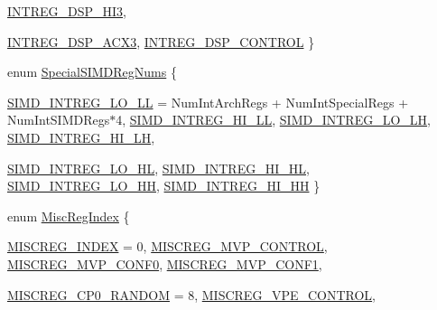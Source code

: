 \begin{DoxyCompactItemize}
\hyperlink{namespaceMipsISA_a9969c99e14b7b491ae9e3751404cc6a1a985097d69553dc760c911447989f8e60}{INTREG\_\-DSP\_\-HI3}, 
\par
\hyperlink{namespaceMipsISA_a9969c99e14b7b491ae9e3751404cc6a1a7b37f81d5304a3d791c17361d9f3a454}{INTREG\_\-DSP\_\-ACX3}, 
\hyperlink{namespaceMipsISA_a9969c99e14b7b491ae9e3751404cc6a1a6e80b2e1811d722f397003fc3aa77298}{INTREG\_\-DSP\_\-CONTROL}
 \}
\item 
enum \hyperlink{namespaceMipsISA_a05e4fcfbdafc2aca59e48af73c7f12ec}{SpecialSIMDRegNums} \{ \par
\hyperlink{namespaceMipsISA_a05e4fcfbdafc2aca59e48af73c7f12ecaf0bcaabf7ff02dc3aaecd4bbf5462813}{SIMD\_\-INTREG\_\-LO\_\-LL} =  NumIntArchRegs + NumIntSpecialRegs + NumIntSIMDRegs$\ast$4, 
\hyperlink{namespaceMipsISA_a05e4fcfbdafc2aca59e48af73c7f12ecac23523b35484e7acda24945e39321a9d}{SIMD\_\-INTREG\_\-HI\_\-LL}, 
\hyperlink{namespaceMipsISA_a05e4fcfbdafc2aca59e48af73c7f12eca23f8f913021c11fa71ba055577cf9a6f}{SIMD\_\-INTREG\_\-LO\_\-LH}, 
\hyperlink{namespaceMipsISA_a05e4fcfbdafc2aca59e48af73c7f12ecaa4f542f3a336be0189b3c160a64422ca}{SIMD\_\-INTREG\_\-HI\_\-LH}, 
\par
\hyperlink{namespaceMipsISA_a05e4fcfbdafc2aca59e48af73c7f12eca646de05bcf6a124da8ef80cf70e19176}{SIMD\_\-INTREG\_\-LO\_\-HL}, 
\hyperlink{namespaceMipsISA_a05e4fcfbdafc2aca59e48af73c7f12eca0b06ae619c82ecbcdd19075de12a5a5d}{SIMD\_\-INTREG\_\-HI\_\-HL}, 
\hyperlink{namespaceMipsISA_a05e4fcfbdafc2aca59e48af73c7f12eca9536486f8f579789069507950c88b7c3}{SIMD\_\-INTREG\_\-LO\_\-HH}, 
\hyperlink{namespaceMipsISA_a05e4fcfbdafc2aca59e48af73c7f12eca9cb0f33583f9adc323b378926c06e2de}{SIMD\_\-INTREG\_\-HI\_\-HH}
 \}
\item 
enum \hyperlink{namespaceMipsISA_a1e522017e015d4c7efd6b2360143aa67}{MiscRegIndex} \{ \par
\hyperlink{namespaceMipsISA_a1e522017e015d4c7efd6b2360143aa67a8362d5a2c785b2b0d1c4e7d8c92689dd}{MISCREG\_\-INDEX} =  0, 
\hyperlink{namespaceMipsISA_a1e522017e015d4c7efd6b2360143aa67a9f330518fd117878b5bee376da98c30b}{MISCREG\_\-MVP\_\-CONTROL}, 
\hyperlink{namespaceMipsISA_a1e522017e015d4c7efd6b2360143aa67a75bfc4f27d49814617ea01dbcb4058d8}{MISCREG\_\-MVP\_\-CONF0}, 
\hyperlink{namespaceMipsISA_a1e522017e015d4c7efd6b2360143aa67ad0a2efb14b3bdb4b79b8dafa3f33854e}{MISCREG\_\-MVP\_\-CONF1}, 
\par
\hyperlink{namespaceMipsISA_a1e522017e015d4c7efd6b2360143aa67ab1b307e154733e3a6d73380ef2d5f01d}{MISCREG\_\-CP0\_\-RANDOM} =  8, 
\hyperlink{namespaceMipsISA_a1e522017e015d4c7efd6b2360143aa67a18227f38efee027f906dc5895ec303dd}{MISCREG\_\-VPE\_\-CONTROL}, 

\end{DoxyCompactItemize}
